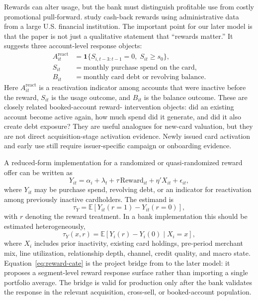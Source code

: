 \documentclass[11pt]{article}
\newcommand{\E}{\mathbb{E}}
\newcommand{\1}{\mathbf{1}}
\begin{document}
Rewards can alter usage, but the bank must distinguish profitable use from
costly promotional pull-forward. \citet{agarwal2010rewards} study cash-back
rewards using administrative data from a large U.S. financial institution. The
important point for our later model is that the paper is not just a qualitative
statement that ``rewards matter.'' It suggests three account-level response
objects:
\begin{align}
  A_{it}^{\mathrm{react}}
    &= \1\{S_{i,t-3:t-1}=0,\; S_{it}\geq s_0\}, \label{eq:reward-reactivation}\\
  S_{it}
    &= \text{monthly purchase spend on the card}, \label{eq:reward-spend-outcome}\\
  B_{it}
    &= \text{monthly card debt or revolving balance}. \label{eq:reward-debt-outcome}
\end{align}
Here $A_{it}^{\mathrm{react}}$ is a reactivation indicator among accounts that
were inactive before the reward, $S_{it}$ is the usage outcome, and $B_{it}$ is
the balance outcome. These are closely related booked-account reward-
intervention objects: did an existing account become active again, how much
spend did it generate, and did it also create debt exposure? They are useful
analogues for new-card valuation, but they are not direct acquisition-stage
activation evidence. Newly issued card activation and early use still require
issuer-specific campaign or onboarding evidence.

A reduced-form implementation for a randomized or quasi-randomized reward offer
can be written as
\begin{equation}
  Y_{it}
  =
  \alpha_i + \lambda_t
  + \tau\,\mathrm{Reward}_{it}
  + \eta' X_{it}
  + \epsilon_{it},
  \label{eq:rewards-treatment}
\end{equation}
where $Y_{it}$ may be purchase spend, revolving debt, or an indicator for
reactivation among previously inactive cardholders. The estimand is
\begin{equation}
  \tau_Y
  =
  \E[Y_{it}(r=1)-Y_{it}(r=0)],
  \label{eq:reward-ate}
\end{equation}
with $r$ denoting the reward treatment. In a bank implementation this should be
estimated heterogeneously,
\begin{equation}
  \tau_Y(x,r)
  =
  \E[Y_i(r)-Y_i(0)\mid X_i=x],
  \label{eq:reward-cate}
\end{equation}
where $X_i$ includes prior inactivity, existing card holdings, pre-period
merchant mix, line utilization, relationship depth, channel, credit quality, and
macro state. Equation~\eqref{eq:reward-cate} is the project bridge from
\citet{agarwal2010rewards} to the later model: it proposes a segment-level
reward response surface rather than importing a single portfolio average. The
bridge is valid for production only after the bank validates the response in
the relevant acquisition, cross-sell, or booked-account population.
\end{document}
